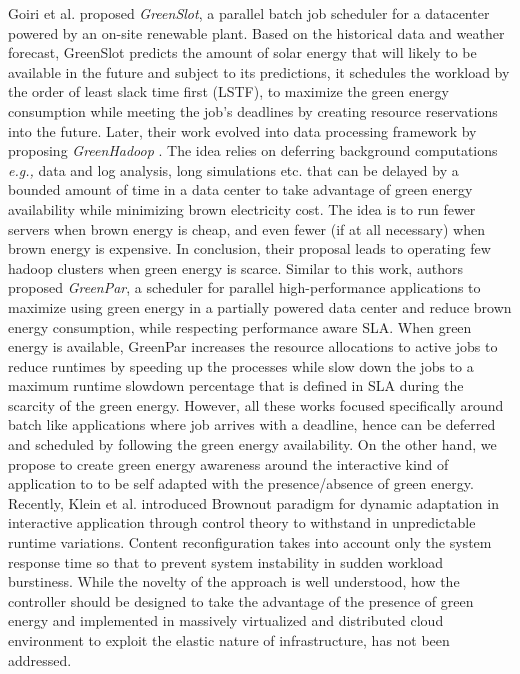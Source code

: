 Goiri et al. \cite{GreenSlot} proposed \emph{GreenSlot}, a parallel batch job scheduler for a datacenter powered by an on-site renewable plant. Based on the historical data and weather forecast, GreenSlot predicts the amount of solar energy that will likely to be available in the future and subject to its predictions, it schedules the workload by the order of least slack time first (LSTF), to maximize the green energy consumption while meeting the job's deadlines by creating resource reservations into the future. Later, their work evolved into data processing framework by proposing \emph{GreenHadoop} \cite{GreenHadoop}. The idea relies on deferring background
computations \emph{e.g.,} data and log analysis, long simulations etc. that can be delayed by a bounded amount of time in a data center to take advantage of green energy availability while minimizing brown electricity cost. The idea is to run fewer servers when brown energy is cheap, and even fewer (if at all necessary) when brown energy is expensive. In conclusion, their proposal leads to operating few
hadoop clusters when green energy is scarce. 
Similar to this work, authors \cite{GreenPar} proposed \emph{GreenPar}, a scheduler for parallel high-performance applications to maximize using green energy in a partially powered data center and reduce brown energy consumption, while respecting performance aware SLA.  When green energy is available, GreenPar increases the resource allocations to active jobs to reduce runtimes by speeding up the processes while slow down the jobs to a maximum runtime slowdown percentage that is defined in SLA during the scarcity of the green energy. However, all these works focused specifically around batch like applications where job arrives with a deadline, hence can be deferred and scheduled by following the green energy availability. On the other hand, we propose to create green energy awareness around the interactive kind of application to to be self adapted with the presence/absence of green energy. Recently, Klein et al. \cite{brownout} introduced Brownout paradigm for dynamic adaptation in interactive application through control theory to withstand in
unpredictable runtime variations. Content reconfiguration takes into account only the system response time so that to prevent system instability in sudden workload burstiness. While the novelty of the approach is well understood,
how the controller should be designed to take the advantage of the presence of green energy and 
implemented in
massively virtualized and distributed cloud environment to exploit the elastic nature of infrastructure,
has not been addressed.

